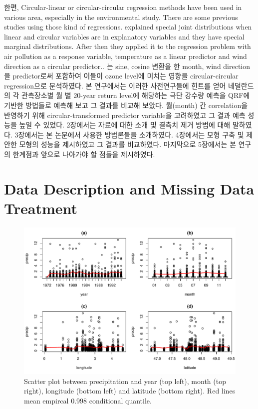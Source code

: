 \documentclass[11pt,titlepage]{article}
\begin{document}
	한편, Circular-linear or circular-circular regression methods have been used in various area, especially in the environmental study. There are some previous studies using those kind of regressions. \citep{Johnson1978} explained special joint distributions when linear and circular variables are in explanatory variables and they have special marginal distributions. After then they applied it to the regression problem with air pollution as a response variable, temperature as a linear predictor and wind direction as a circular predictor.. \citep{Jammalamadaka2006}는 sine, cosine 변환을 한 month, wind direction을 predictor로써 포함하여 이들이 ozone level에 미치는 영향을 circular-circular regression으로 분석하였다.
	본 연구에서는 이러한 사전연구들에 힌트를 얻어 네덜란드의 각 관측장소별 월 별 20-year return level에 해당하는 극단 강수량 예측을 QRF에 기반한 방법들로 예측해 보고 그 결과를 비교해 보았다. 월(month) 간 correlation을 반영하기 위해 circular-transformed predictor variable을 고려하였고 그 결과 예측 성능을 높일 수 있었다. 2장에서는 자료에 대한 소개 및 결측치 제거 방법에 대해 말하였다. 3장에서는 본 논문에서 사용한 방법론들을 소개하였다. 4장에서는 모형 구축 및 제안한 모형의 성능을 제시하였고 그 결과를 비교하였다. 마지막으로 5장에서는 본 연구의 한계점과 앞으로 나아가야 할 점들을 제시하였다.
	
	\section{Data Description and Missing Data Treatment}
	
	\begin{figure}
		\centering
		\includegraphics[scale=0.75]{Scatter3.pdf}
		\caption{Scatter plot between precipitation and year (top left), month (top right), longitude (bottom left) and latitude (bottom right). Red lines mean empircal 0.998 conditional quantile.}
		\label{fig:scatter}
	\end{figure}
	
\end{document}
